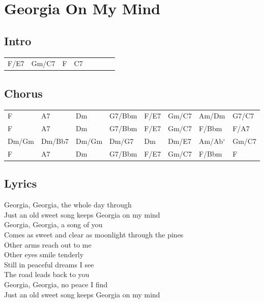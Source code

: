 \section{Georgia On My Mind}


\subsection*{Intro}


\begin{tabular}{l l l l l l l l}
F/E7 & Gm/C7 & F & C7 \\ 
\end{tabular}


\subsection*{Chorus}


\begin{tabular}{l l l l l l l l}
F & A7 & Dm & G7/Bbm & F/E7 & Gm/C7 & Am/Dm & G7/C7 \\ 
F & A7 & Dm & G7/Bbm & F/E7 & Gm/C7 & F/Bbm & F/A7 \\ 
Dm/Gm & Dm/Bb7 & Dm/Gm & Dm/G7 & Dm & Dm/E7 & Am/Ab$^{\circ}$ & Gm/C7 \\ 
F & A7 & Dm & G7/Bbm & F/E7 & Gm/C7 & F/Bbm & F \\ 
\end{tabular}


\subsection*{Lyrics}


Georgia, Georgia, the whole day through \\ 
Just an old sweet song keeps Georgia on my mind  \\ 
Georgia, Georgia, a song of you \\ 
Comes as sweet and clear as moonlight through the pines \\ 

Other arms reach out to me \\ 
Other eyes smile tenderly \\ 
Still in peaceful dreams I see \\ 
The road leads back to you \\ 

Georgia, Georgia, no peace I find \\ 
Just an old sweet song keeps Georgia on my mind \\ 
